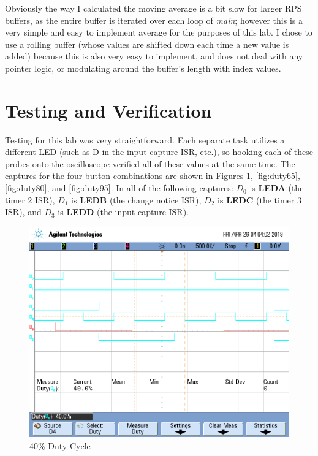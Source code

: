 \documentclass[a4paper, 12pt]{article}
\begin{document}
Obviously the way I calculated the moving average is a bit slow for larger RPS buffers, as the entire buffer is iterated over each loop of \textit{main}; however this is a very simple and easy to implement average for the purposes of this lab. I chose to use a rolling buffer (whose values are shifted down each time a new value is added) because this is also very easy to implement, and does not deal with any pointer logic, or modulating around the buffer's length with index values.

\section{Testing and Verification}
Testing for this lab was very straightforward. Each separate task utilizes a different LED (such as D in the input capture ISR, etc.), so hooking each of these probes onto the oscilloscope verified all of these values at the same time. The captures for the four button combinations are shown in Figures \ref{fig:duty40}, \ref{fig:duty65}, \ref{fig:duty80}, and \ref{fig:duty95}. In all of the following captures: $D_0$ is \textbf{LEDA} (the timer 2 ISR), $D_1$ is \textbf{LEDB} (the change notice ISR), $D_2$ is \textbf{LEDC} (the timer 3 ISR), and $D_3$ is \textbf{LEDD} (the input capture ISR).

\begin{figure}[H]
\centering
\includegraphics[width=.8\textwidth]{scope_0.png}
\caption{40\% Duty Cycle}
\label{fig:duty40}
\end{figure}
\end{document}
